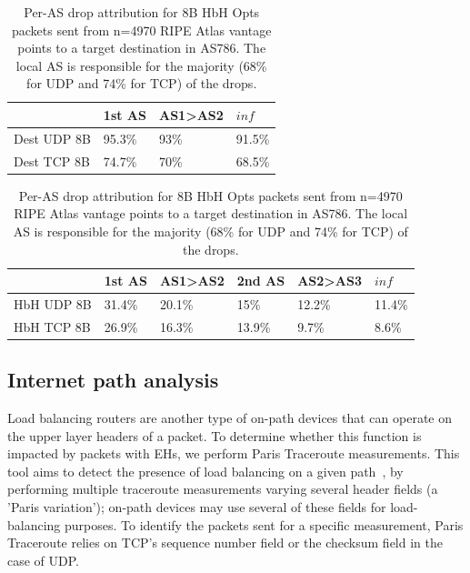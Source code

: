 \documentclass[conference]{IEEEtran}
\begin{document}
\begin{table}[]
\centering
\caption{Per-AS drop attribution for 8B Dest Opts packets sent from n=4970 RIPE Atlas vantage points to a target destination in AS786. The local AS is responsible for the majority (5\% for UDP and 25\% for TCP) of the drops.}
 \label{tbl:uk_as1}

\begin{tabular}{l|l|l|l}
                                   & 1st AS & AS1\textgreater AS2 & $inf $     \\ \hline 

{Dest UDP 8B} & 95.3\% & 93\%                 & 91.5\% \\ \hline

{Dest TCP 8B} & 74.7\% & 70\%                 & 68.5\%
\end{tabular}
\bigskip
\caption{Per-AS drop attribution for 8B HbH Opts packets sent from n=4970 RIPE Atlas vantage points to a target destination in AS786. The local AS is responsible for the majority (68\% for UDP and 74\% for TCP) of the drops.}
\begin{tabular}{p{}|l|l|l|l|l}

              & 1st AS & AS1\textgreater{}AS2 & 2nd AS & AS2\textgreater{}AS3 & $inf$     \\ \hline
HbH UDP 8B & 31.4\% & 20.1\%               & 15\%   & 12.2\%               & 11.4\% \\ \hline
HbH TCP 8B & 26.9\% & 16.3\%               & 13.9\% & 9.7\%                & 8.6\%  \\ 
\end{tabular}
 \label{tbl:uk_as2}
\end{table}


\subsection{Internet path analysis}

Load balancing routers are another type of on-path devices that can operate on the upper layer headers of a packet. To determine whether this function is impacted by packets with EHs, we perform Paris Traceroute measurements. This tool aims to detect the presence of load balancing on a given path~\cite{augustin2006avoiding}, by performing multiple traceroute measurements varying several header fields (a 'Paris variation'); on-path devices may use several of these fields for load-balancing purposes. To identify the packets sent for a specific measurement, Paris Traceroute relies on  TCP's sequence number field or the checksum field in the case of UDP.
\end{document}
